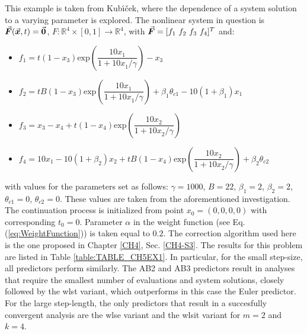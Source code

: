 This example is taken from Kub{\'\i}{\v{c}}ek\cite{Kubicek76}, where the
dependence of a system solution to a varying parameter is explored. The 
nonlinear
system in question is $\vec{\bm{F}}(\vec{\bm{x}},t)=\vec{\bm{0}}$,
$F:\mathbb{R}^4\times[0,1]\rightarrow\mathbb{R}^4$, with $\bvec{F}=[f_1\ f_2\ 
f_3\ f_4]^T$ and:
\begin{itemize}
	\item[] $f_1 = 
	t(1-x_3)\text{exp}(\dfrac{10x_1}{1+10x_1^{}/\gamma})-x_3$
	\item[] $f_2 = t
	B(1-x_3)\text{exp}(\dfrac{10x_1}{1+10x_1^{}/\gamma})+\beta_1\theta_{c1}-10(1+\beta_1)x_1$
	\item[] $f_3 = x_3-x_4+t(1-x_4)\text{exp}(\dfrac{10x_2}{1+10x_2^{}/\gamma})$
	\item[] $f_4 = 10x_1-10(1+ \beta_2)x_2+t
	B(1-x_4)\text{exp}(\dfrac{10x_2}{1+10x_2^{}/\gamma})+\beta_2\theta_{c2}$
\end{itemize}
with values for the parameters set as follows: $\gamma=1000$, $B=22$, 
$\beta_1=2$, $\beta_2=2$, $\theta_{c1}=0$,
$\theta_{c2}=0$. These values are taken from the aforementioned investigation. 
The continuation
process is initialized from point $x_0=(0,0,0,0)$ with corresponding
$t_0=0$. Parameter $\alpha$ in the weight function (see Eq. 
(\ref{eq:WeightFunction})) is taken equal to $0.2$. The correction algorithm 
used
here is the one proposed in Chapter \ref{CH4}, Sec. \ref{CH4-S3}. The results 
for this problem are listed in Table \ref{table:TABLE_CH5EX1}. In particular, 
for the small step-size, all predictors perform similarly. The AB2 and AB3 
predictors result in analyses that require the smallest number of evaluations 
and system solutions, closely followed by the \acrshort{wlst} variant, which 
outperforms in this case the Euler predictor. For the large step-length, the 
only predictors that result in a succesfully convergent analysis are the 
\acrshort{wlse} variant and the \acrshort{wlsit} variant for $m=2$ and $k=4$.

